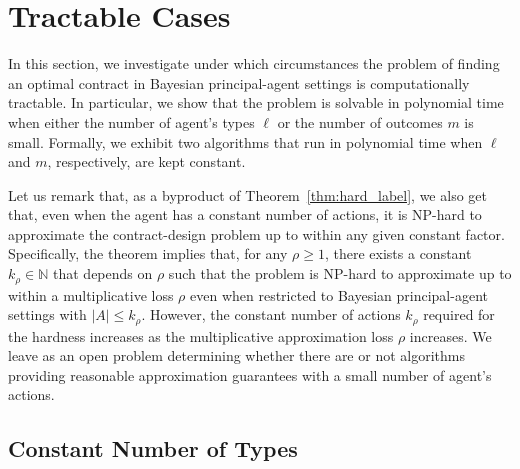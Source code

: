 \section{Tractable Cases}\label{sec:tractable}


In this section, we investigate under which circumstances the problem of finding an optimal contract in Bayesian principal-agent settings is computationally tractable.
%
In particular, we show that the problem is solvable in polynomial time when either the number of agent's types $\ell$ or the number of outcomes $m$ is small.
%
Formally, we exhibit two algorithms that run in polynomial time when $\ell$ and $m$, respectively, are kept constant.


Let us remark that, as a byproduct of Theorem~\ref{thm:hard_label}, we also get that, even when the agent has a constant number of actions, it is \textsf{NP}-hard to approximate the contract-design problem up to within any given constant factor.
%
Specifically, the theorem implies that, for any $\rho \ge 1$, there exists a constant $k_\rho \in \mathbb{N}$ that depends on $\rho$ such that the problem is \textsf{NP}-hard to approximate up to within a multiplicative loss $\rho$ even when restricted to Bayesian principal-agent settings with $|A| \leq k_\rho$. 
%
However, the constant number of actions $k_\rho$ required for the hardness increases as the multiplicative approximation loss $\rho$ increases.
%
We leave as an open problem determining whether there are or not algorithms providing reasonable approximation guarantees with a small number of agent's actions.


\subsection{Constant Number of Types}

